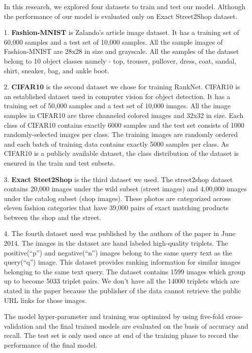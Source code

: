 \documentclass[10pt,twocolumn,letterpaper]{article}
\begin{document}
In this research, we explored four datasets to train and test our model. Although the performance of our model is evaluated only on Exact Street2Shop dataset.

1. \textbf{Fashion-MNIST} \cite{c18} is Zalando's article image dataset. It has a training set of 60,000 samples and a test set of 10,000 samples. All the sample images of Fashion-MNIST are 28x28 in size and grayscale. All the samples of the dataset belong to 10 object classes namely - top, trouser, pullover, dress, coat, sandal, shirt, sneaker, bag, and ankle boot.

2. \textbf{CIFAR10} \cite{c19} is the second dataset we chose for training RankNet. CIFAR10 is an established dataset used in computer vision for object detection. It has a training set of 50,000 samples and a test set of 10,000 images. All the image samples in CIFAR10 are three channeled colored images and 32x32 in size. Each class of CIFAR10 contains exactly 6000 samples and the test set consists of 1000 randomly-selected images per class. The training images are randomly ordered and each batch of training data contains exactly 5000 samples per class. As CIFAR10 is a publicly available dataset, the class distribution of the dataset is ensured in the train and test subsets.

3. \textbf{Exact Steet2Shop} \cite{c20} is the third dataset we used. The street2shop dataset contains 20,000 images under the wild subset (street images) and 4,00,000 images under the catalog subset (shop images). These photos are categorized across eleven fashion categories that have 39,000 pairs of exact matching products between the shop and the street.

4. The fourth dataset used was published by the authors of the paper \cite{c21} in June 2014. The images in the dataset are hand labeled high-quality triplets. The positive(“p”) and negative(“n”) images belong to the same query text as the query(“q”) image. This dataset provides ranking information for similar images belonging to the same text query. The dataset contains 1599 images which group up to become 5033 triplet pairs. We don't have all the 14000 triplets which are stated in the paper \cite{c21} because the publisher of the data cannot retrieve the public URL links for those images.

The model hyper-parameter and training was optimized by using five-fold cross-validation and the final trained models are evaluated on the basis of accuracy and recall. The test set is only used once at end of the training phase to record the performance of the final model.
\end{document}
